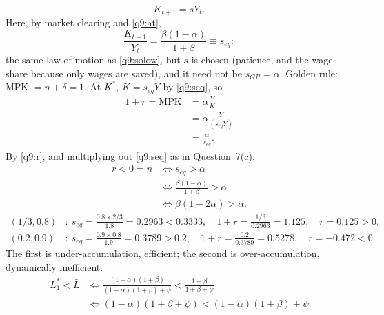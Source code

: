 \begin{sol}
\begin{center}
\end{center}
\begin{equation}
K_{t+1}=sY_t. \label{q9:solow}
\end{equation}
Here, by market clearing and \eqref{q9:at},
\begin{equation}
\frac{K_{t+1}}{Y_t}=\frac{\beta(1-\alpha)}{1+\beta}\equiv s_{eq}: \label{q9:seq}
\end{equation}
the same law of motion as \eqref{q9:solow}, but $s$ is chosen (patience, and the wage share because only wages are saved), and it
need not be $s_{GR}=\alpha$. Golden rule: MPK $=n+\delta=1$. At $K^\ast$, $K=s_{eq}Y$ by \eqref{q9:seq}, so
\begin{align}
1+r=\text{MPK} &= \alpha\frac YK\nonumber\\
&= \alpha\frac{Y}{(s_{eq}Y)}\nonumber\\
&= \frac{\alpha}{s_{eq}}. \label{q9:r}
\end{align}
By \eqref{q9:r}, and multiplying out \eqref{q9:seq} as in Question~7(c):
\begin{align*}
r<0=n &\iff s_{eq}>\alpha\\
&\iff \frac{\beta(1-\alpha)}{1+\beta}>\alpha\\
&\iff \beta(1-2\alpha)>\alpha .
\end{align*}
\begin{align*}
(1/3,0.8) &: \ s_{eq}=\tfrac{0.8\times2/3}{1.8}=0.2963<0.3333,\quad 1+r=\tfrac{1/3}{0.2963}=1.125,\quad r=0.125>0,\\
(0.2,0.9) &: \ s_{eq}=\tfrac{0.9\times0.8}{1.9}=0.3789>0.2,\quad 1+r=\tfrac{0.2}{0.3789}=0.5278,\quad r=-0.472<0.
\end{align*}
The first is under-accumulation, efficient; the second is over-accumulation, dynamically inefficient.
\begin{align*}
L_1^\ast<\bar L &\iff \frac{(1-\alpha)(1+\beta)}{(1-\alpha)(1+\beta)+\psi}<\frac{1+\beta}{1+\beta+\psi}\\
&\iff (1-\alpha)(1+\beta+\psi)<(1-\alpha)(1+\beta)+\psi\\

\end{align*}
\end{sol}
